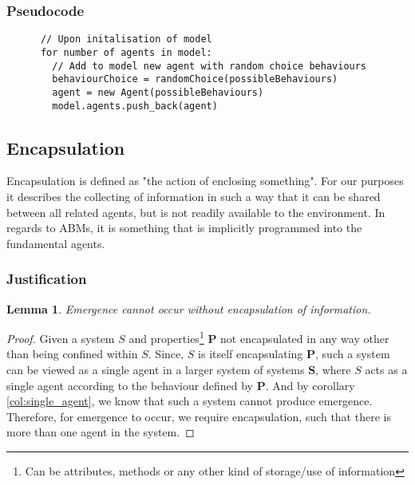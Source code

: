 \documentclass{article}
\newtheorem{lemma}[theorem]{Lemma}
\begin{document}
    \subsubsection{Pseudocode}
      
      \begin{verbatim}
      // Upon initalisation of model
      for number of agents in model:
        // Add to model new agent with random choice behaviours
        behaviourChoice = randomChoice(possibleBehaviours) 
        agent = new Agent(possibleBehaviours)
        model.agents.push_back(agent)
      \end{verbatim}


  \subsection{Encapsulation}
  \label{sec: encap}
      
    Encapsulation is defined as "the action of enclosing something". For our purposes it describes the collecting of information in such a way that it can be shared between all related agents, but is not readily available to the environment. In regards to ABMs, it is something that is implicitly programmed into the fundamental agents.

    \subsubsection{Justification}


      \begin{lemma}
        Emergence cannot occur without encapsulation of information.
      \end{lemma}
      \begin{proof}
        
        Given a system $S$ and properties\footnote{Can be attributes, methods or  any other kind of storage/use of information} $\bm{P}$ not encapsulated in any way other than being confined within $S$. Since, $S$ is itself encapsulating $\bm{P}$, such a system can be viewed as a single agent in a larger system of systems $\bm{S}$, where $S$ acts as a single agent according to the behaviour defined by $\bm{P}$. And by corollary \ref{col:single_agent}, we know that such a system cannot produce emergence. Therefore, for emergence to occur, we require encapsulation, such that there is more than one agent in the system. 

      \end{proof}
\end{document}
